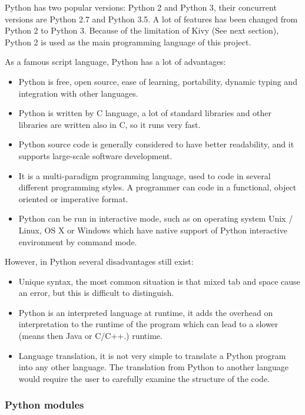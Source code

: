 Python has two popular versions: Python 2 and Python 3, their concurrent versions are Python 2.7 and Python 3.5. A lot of features has been changed from Python 2 to Python 3. Because of the limitation of Kivy (See next section), Python 2 is used as the main programming language of this project.

As a famous script language, Python has a lot of advantages:

\begin{itemize}
	\item Python is free, open source, ease of learning, portability, dynamic typing and integration with other languages.
	\item Python is written by C language, a lot of standard libraries and other libraries are written also in C, so it runs very fast.
	\item Python source code is generally considered to have better readability, and it supports large-scale software development.
	\item It is a multi-paradigm programming language, used to code in several different programming styles. A programmer can code in a functional, object oriented or imperative format.
	\item Python can be run in interactive mode, such as on operating system Unix / Linux, OS X or Windows which have native support of Python interactive environment by command mode.
\end{itemize}

However, in Python several disadvantages still exist: 

\begin{itemize}
	\item Unique syntax, the most common situation is that mixed tab and space cause an error, but this is difficult to distinguish. 
	\item Python is an interpreted language at runtime, it adds the overhead on interpretation to the runtime of the program which can lead to a slower (means then Java or C/C++.) runtime.  
	\item Language translation,  it is not very simple to translate a Python program into any other language. The translation from Python to another language would require the user to carefully examine the structure of the code.
\end{itemize}

\subsubsection{Python modules}

